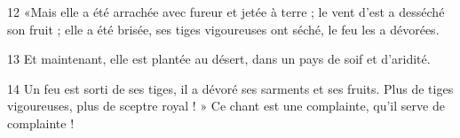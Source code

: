 
12 «Mais elle a été arrachée avec fureur et jetée à terre ; le vent d’est a desséché son fruit ; elle a été brisée, ses tiges vigoureuses ont séché, le feu les a dévorées.

13 Et maintenant, elle est plantée au désert, dans un pays de soif et d’aridité.

14 Un feu est sorti de ses tiges, il a dévoré ses sarments et ses fruits. Plus de tiges vigoureuses, plus de sceptre royal ! » Ce chant est une complainte, qu’il serve de complainte !